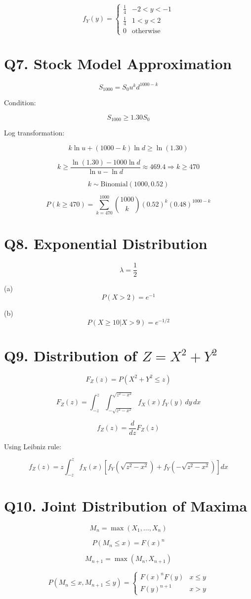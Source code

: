 \documentclass[11pt]{article}
\begin{document}
\[
f_Y(y) =
\begin{cases}
\frac{1}{4} & -2 < y < -1 \\
\frac{1}{4} & 1 < y < 2 \\
0 & \text{otherwise}
\end{cases}
\]

\section*{Q7. Stock Model Approximation}

\[
S_{1000} = S_0 u^k d^{1000-k}
\]

Condition:

\[
S_{1000} \ge 1.30 S_0
\]

Log transformation:

\[
k \ln u + (1000-k)\ln d \ge \ln(1.30)
\]

\[
k \ge \frac{\ln(1.30) - 1000\ln d}{\ln u - \ln d}
\approx 469.4 \Rightarrow k \ge 470
\]

\[
k \sim \text{Binomial}(1000, 0.52)
\]

\[
P(k \ge 470) =
\sum_{k=470}^{1000}
\binom{1000}{k}
(0.52)^k (0.48)^{1000-k}
\]

\section*{Q8. Exponential Distribution}

\[
\lambda = \frac{1}{2}
\]

(a)
\[
P(X > 2) = e^{-1}
\]

(b)
\[
P(X \ge 10 | X > 9) = e^{-1/2}
\]

\section*{Q9. Distribution of $Z = X^2 + Y^2$}

\[
F_Z(z) = P(X^2 + Y^2 \le z)
\]

\[
F_Z(z) =
\int_{-z}^{z}
\int_{-\sqrt{z^2 - x^2}}^{\sqrt{z^2 - x^2}}
f_X(x)f_Y(y)\, dy\, dx
\]

\[
f_Z(z) = \frac{d}{dz}F_Z(z)
\]

Using Leibniz rule:

\[
f_Z(z) =
z \int_{-z}^{z}
f_X(x)\left[
f_Y(\sqrt{z^2 - x^2}) + f_Y(-\sqrt{z^2 - x^2})
\right] dx
\]

\section*{Q10. Joint Distribution of Maxima}

\[
M_n = \max(X_1,\dots,X_n)
\]

\[
P(M_n \le x) = F(x)^n
\]

\[
M_{n+1} = \max(M_n, X_{n+1})
\]

\[
P(M_n \le x, M_{n+1} \le y) =
\begin{cases}
F(x)^n F(y) & x \le y \\
F(y)^{n+1} & x > y
\end{cases}
\]
\end{document}
